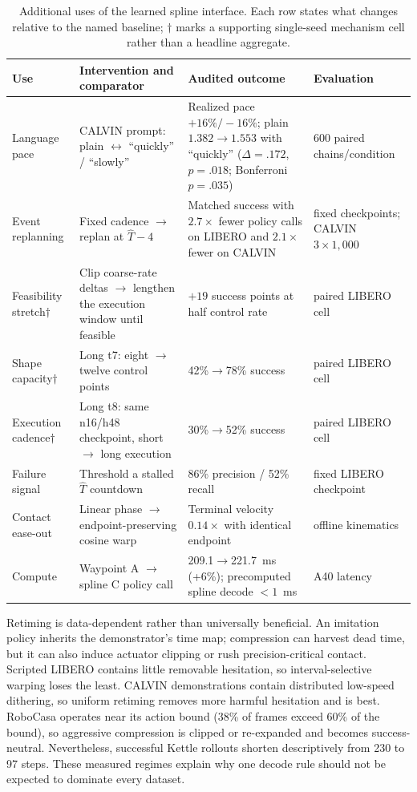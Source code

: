 \begin{table}[t]
\centering
\caption{Additional uses of the learned spline interface. Each row states what changes relative to the named baseline; $\dagger$ marks a supporting single-seed mechanism cell rather than a headline aggregate.}
\label{tab:control}
\small
\setlength{\tabcolsep}{4pt}
\renewcommand{\arraystretch}{1.08}
\begin{tabularx}{\textwidth}{@{}l X X l@{}}
\toprule
Use & Intervention and comparator & Audited outcome & Evaluation \\
\midrule
Language pace & CALVIN prompt: plain $\leftrightarrow$ ``quickly'' / ``slowly'' & Realized pace $+16\%/-16\%$; plain \mbox{$1.382\rightarrow1.553$} with ``quickly'' ($\Delta=.172$, $p=.018$; Bonferroni $p=.035$) & 600 paired chains/condition \\
Event replanning & Fixed cadence $\rightarrow$ replan at $\hat T-4$ & Matched success with $2.7\times$ fewer policy calls on LIBERO and $2.1\times$ fewer on CALVIN & fixed checkpoints; CALVIN $3\times1{,}000$ \\
Feasibility stretch$\dagger$ & Clip coarse-rate deltas $\rightarrow$ lengthen the execution window until feasible & $+19$ success points at half control rate & paired LIBERO cell \\
Shape capacity$\dagger$ & Long t7: eight $\rightarrow$ twelve control points & 42\%$\rightarrow$78\% success & paired LIBERO cell \\
Execution cadence$\dagger$ & Long t8: same n16/h48 checkpoint, short $\rightarrow$ long execution & 30\%$\rightarrow$52\% success & paired LIBERO cell \\
Failure signal & Threshold a stalled $\hat T$ countdown & 86\% precision / 52\% recall & fixed LIBERO checkpoint \\
Contact ease-out & Linear phase $\rightarrow$ endpoint-preserving cosine warp & Terminal velocity $0.14\times$ with identical endpoint & offline kinematics \\
Compute & Waypoint A $\rightarrow$ spline C policy call & 209.1$\rightarrow$221.7~ms (+6\%); precomputed spline decode $<1$~ms & A40 latency \\
\bottomrule
\end{tabularx}
\end{table}

Retiming is data-dependent rather than universally beneficial. An imitation policy inherits the demonstrator's time map; compression can harvest dead time, but it can also induce actuator clipping or rush precision-critical contact. Scripted LIBERO contains little removable hesitation, so interval-selective warping loses the least. CALVIN demonstrations contain distributed low-speed dithering, so uniform retiming removes more harmful hesitation and is best. RoboCasa operates near its action bound (38\% of frames exceed 60\% of the bound), so aggressive compression is clipped or re-expanded and becomes success-neutral. Nevertheless, successful Kettle rollouts shorten descriptively from 230 to 97 steps. These measured regimes explain why one decode rule should not be expected to dominate every dataset.

